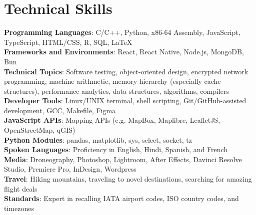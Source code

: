 \documentclass[letterpaper,11pt]{article}
\begin{document}
\section{Technical Skills}
 \begin{itemize}[leftmargin=0in, label={}]
    \small{\item{
      \textbf{Programming Languages}{: C/C++, Python, x86-64 Assembly, JavaScript, TypeScript, HTML/CSS, R, SQL, \LaTeX} \\
      \textbf{Frameworks and Environments}{: React, React Native, Node.js, MongoDB, Bun} \\
      \textbf{Technical Topics}{: Software testing, object-oriented design,
      encrypted network programming, machine arithmetic, memory hierarchy
      (especially cache structures), performance analytics, data structures,
      algorithms, compilers} \\
      \textbf{Developer Tools}{: Linux/UNIX terminal, shell scripting,
      Git/GitHub-assisted development, GCC, Makefile, Figma} \\
      \textbf{JavaScript APIs}{: Mapping APIs (e.g. MapBox, Maplibre, LeafletJS,
      OpenStreetMap, qGIS)} \\
      \textbf{Python Modules}{: pandas, matplotlib, sys, select, socket, tz}\\
      \textbf{Spoken Languages}{: Proficiency in English, Hindi, Spanish, and French} \\
      \textbf{Media}{: Droneography, Photoshop, Lightroom, After Effects, Davinci Resolve Studio, Premiere Pro, InDesign, Wordpress} \\
     \textbf{Travel}{: Hiking mountains, traveling to novel destinations, searching for amazing flight deals} \\
     \textbf{Standards}{: Expert in recalling IATA airport codes, ISO country codes, and timezones} \\
     
    }}
 \end{itemize}
\end{document}
